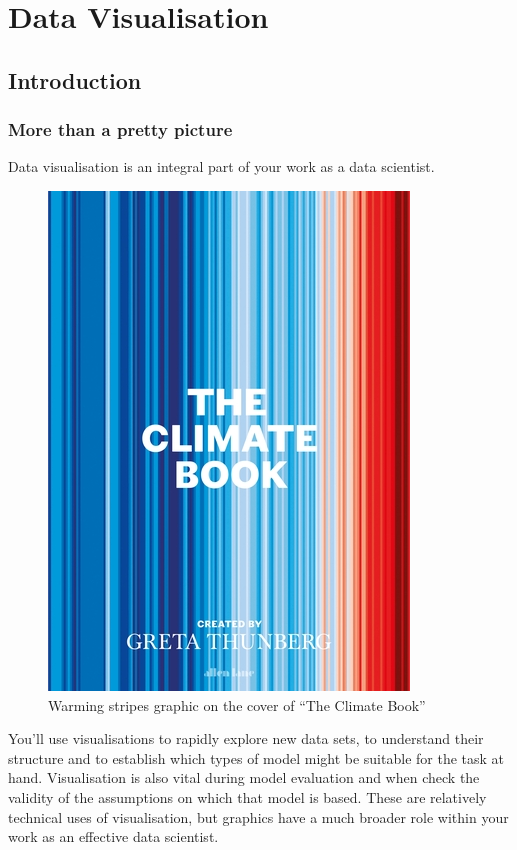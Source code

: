 \documentclass[
  letterpaper,
  DIV=11,
  numbers=noendperiod]{scrreprt}
\begin{document}
\chapter{Data Visualisation}\label{edav-visualisation}

\section{Introduction}\label{introduction-4}

\subsection{More than a pretty
picture}\label{more-than-a-pretty-picture}

Data visualisation is an integral part of your work as a data scientist.

\begin{figure}[H]

{\centering \includegraphics{images/303-data-visualisation/the-climate-book-jacket.jpg}

}

\caption{Warming stripes graphic on the cover of ``The Climate Book''}

\end{figure}%

You'll use visualisations to rapidly explore new data sets, to
understand their structure and to establish which types of model might
be suitable for the task at hand. Visualisation is also vital during
model evaluation and when check the validity of the assumptions on which
that model is based. These are relatively technical uses of
visualisation, but graphics have a much broader role within your work as
an effective data scientist.
\end{document}

